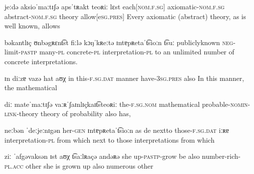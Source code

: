 
              {jeːdə aksioˈmaːtɪʃə apsˈtʀakt teoʀiː lɛst}
              {each[\textsc{nom}.\textsc{f}.\textsc{sg}] axiomatic-\textsc{nom}.\textsc{f}.\textsc{sg} abstract-\textsc{nom}.\textsc{f}.\textsc{sg} theory allow[e\textsc{sg}.\textsc{pres}]}
              {{Every} {axiomatic} {(abstract)} theory, {as is well known, allows}}

              {bəkantlɪç ʊnbəgʀɛn\t{ts}t fiːlə kɔŋˈkʀeːtə ɪntɐpʀetaˈ\t{ts}ioːn \t{ts}uː}
              {{publicly{\textunderscore}known} \textsc{neg}-limit-\textsc{pastp} many-\textsc{pl} concrete-\textsc{pl} interpretation-\textsc{pl} to}
              {{an} {unlimited} {number of} concrete interpretations.}

              {ɪn diːzɐ vazə hat aʊχ}
              {in this-\textsc{f}.\textsc{sg}.\textsc{dat} manner have-\textsc{3sg}.\textsc{pres} also}
              {In this manner, {the} {mathematical}}

              {diː mateˈmaːtɪʃə vaːʀˈʃaɪnlɪçkaɪ\t{ts}teoʀiː}
              {the-\textsc{f}.\textsc{sg}.\textsc{nom} mathematical probable-\textsc{nomin}-\textsc{link}-theory}
              {{theory of} {probability} {also has,}}

              {neːbən ˈdeːjeːnɪgən her-\textsc{gen} ɪntɐpʀetaˈ\t{ts}ioːn as de}
              {{next{\textunderscore}to} {those-\textsc{f}.\textsc{sg}.\textsc{dat}} iːʀɐ interpretation-\textsc{pl} from which}
              {{next to} those  interpretations from which}

              {ziː ˈafgəvaksən ɪst aʊχ \t{ts}aːlʀaçə andəʀə}
              {she up-\textsc{pastp}-grow be also number-rich-\textsc{pl}.\textsc{acc} other}
              {she is {grown up} also numerous other}
